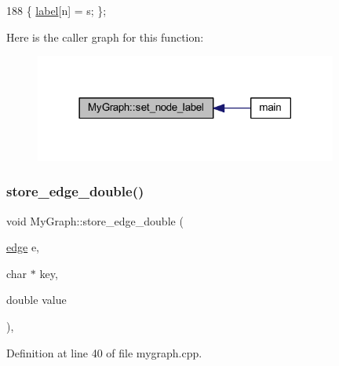 \begin{DoxyCode}
188 \{ \mbox{\hyperlink{class_my_graph_a5c9923e2b43cb5a3139715acc34b8ca8}{label}}[n] = s; \};
\end{DoxyCode}
Here is the caller graph for this function\+:
\nopagebreak
\begin{figure}[H]
\begin{center}
\leavevmode
\includegraphics[width=282pt]{class_my_graph_ac70ce0dc28c8589443e45ef89acd00ca_icgraph}
\end{center}
\end{figure}
\mbox{\label{class_my_graph_a5814b5aa19c45ba8cf5004c8b9ae3667}} 
\subsubsection{\texorpdfstring{store\+\_\+edge\+\_\+double()}{store\_edge\_double()}}
{\footnotesize\ttfamily void My\+Graph\+::store\+\_\+edge\+\_\+double (\begin{DoxyParamCaption}\item[{\mbox{\hyperlink{classedge}{edge}}}]{e,  }\item[{char $\ast$}]{key,  }\item[{double}]{value }\end{DoxyParamCaption})\hspace{0.3cm}{\ttfamily [virtual]}, {\ttfamily [inherited]}}



Definition at line 40 of file mygraph.\+cpp.


